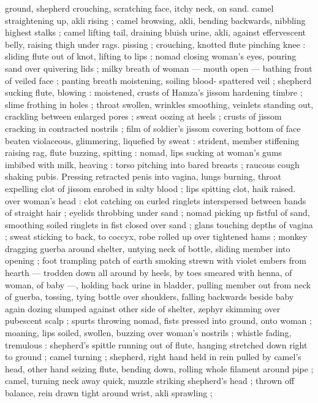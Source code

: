 ground, shepherd crouching, scratching face, itchy neck, on sand. 
camel straightening up, akli rising ; camel browsing, akli, bending 
backwards, nibbling highest stalks ; camel lifting tail, draining bluish 
urine, akli, against effervescent belly, raising thigh under rags. 
pissing ; crouching, knotted flute pinching knee : sliding flute out of 
knot, lifting to lips ; nomad closing woman's eyes, pouring sand over 
quivering lids ; milky breath of woman --- mouth open --- bathing 
front of veiled face ; panting breath moistening, soiling blood- 
spattered veil ; shepherd sucking flute, blowing : moistened, crusts 
of Hamza's jissom hardening timbre ; slime frothing in holes ; throat 
swollen, wrinkles smoothing, veinlets standing out, crackling 
between enlarged pores ; sweat oozing at heels ; crusts of jissom 
cracking in contracted nostrils ; film of soldier's jissom covering 
bottom of face beaten violaceous, glimmering, liquefied by sweat : 
strident, member stiffening raising rag, flute buzzing, spitting : 
nomad, lips sucking at woman's gums imbibed with milk, heaving : 
torso pitching into bared breasts ; raucous cough shaking pubis. 
Pressing retracted penis into vagina, lungs burning, throat expelling 
clot of jissom enrobed in salty blood ; lips spitting clot, haik raised. 
over woman's head : clot catching on curled ringlets interspersed 
between bands of straight hair ; eyelids throbbing under sand ; 
nomad picking up fistful of sand, smoothing soiled ringlets in fist 
closed over sand ; glans touching depths of vagina ; sweat sticking 
to back, to coccyx, robe rolled up over tightened hams ; monkey 
dragging guerba around shelter, untying neck of bottle, sliding 
member into opening ; foot trampling patch of earth smoking strewn 
with violet embers from hearth --- trodden down all around by heels, 
by toes smeared with henna, of woman, of baby ---, holding back 
urine in bladder, pulling member out from neck of guerba, tossing, 
tying bottle over shoulders, falling backwards beside baby again 
dozing slumped against other side of shelter, zephyr skimming over 
pubescent scalp ; spurts throwing nomad, fists pressed into ground, 
onto woman ; moaning, lips soiled, swollen, buzzing over woman's 
nostrils ; whistle fading, tremulous : shepherd's spittle running out 
of flute, hanging stretched down right to ground ; camel turning ; 
shepherd, right hand held in rein pulled by camel's head, other hand 
seizing flute, bending down, rolling whole filament around pipe ; 
camel, turning neck away quick, muzzle striking shepherd's head ; 
thrown off balance, rein drawn tight around wrist, akli sprawling ; 
